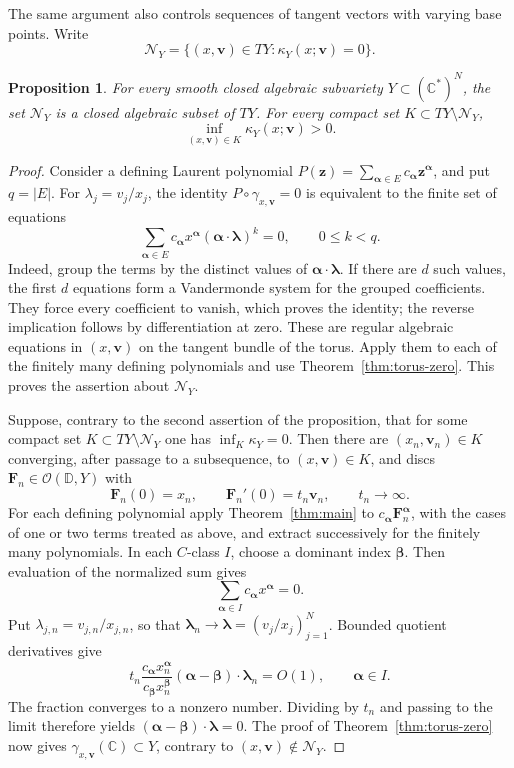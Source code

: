 \documentclass[12pt,letterpaper,reqno]{amsart}
\newtheorem{prop}[thm]{Proposition}
\theoremstyle{definition}
\numberwithin{equation}{section}
\newcommand{\D}{\mathbb D}
\newcommand{\C}{\mathbb C}
\newcommand{\OO}{\mathcal O}
\begin{document}
	The same argument also controls sequences of tangent vectors with
	varying base points. Write
	\[
	\mathcal N_Y=\{(x,\bm{v})\in TY:\kappa_Y(x;\bm{v})=0\}.
	\]
	
	\begin{prop}\label{prop:torus-null-set}
		For every smooth closed algebraic subvariety $Y\subset(\C^*)^N$,
		the set $\mathcal N_Y$ is a closed algebraic subset of $TY$. For
		every compact set $K\subset TY\setminus\mathcal N_Y$,
		\[
		\inf_{(x,\bm{v})\in K}\kappa_Y(x;\bm{v})>0.
		\]
	\end{prop}
	
	\begin{proof}
		Consider a defining Laurent polynomial
		$P(\bm{z})=\sum_{\bm{\alpha}\in E}c_{\bm{\alpha}} \bm{z}^{\bm{\alpha}}$, and put $q=|E|$.
		For $\lambda_j=v_j/x_j$, the identity
		$P\circ\gamma_{x,\bm{v}}=0$ is equivalent to the finite set of equations
		\[
		\sum_{\bm{\alpha}\in E}c_{\bm{\alpha}} x^{\bm{\alpha}}(\bm{\alpha}\cdot\bm{\lambda})^k=0,
		\qquad 0\le k<q.
		\]
		Indeed, group the terms by the distinct values of
		$\bm{\alpha}\cdot\bm{\lambda}$. If there are $d$ such values, the first $d$
		equations form a Vandermonde system for the grouped coefficients.
		They force every coefficient to vanish, which proves the identity;
		the reverse implication follows by differentiation at zero.
		These are regular algebraic equations in $(x,\bm{v})$ on the tangent
		bundle of the torus. Apply them to each of the finitely many defining
		polynomials and use Theorem~\ref{thm:torus-zero}. This proves the
		assertion about $\mathcal N_Y$.
		
		Suppose, contrary to the second assertion of the proposition, that
		for some compact set $K\subset TY\setminus\mathcal N_Y$ one has
		$\inf_K\kappa_Y=0$. Then there are $(x_n,\bm{v}_n)\in K$ converging,
		after passage to a subsequence, to $(x,\bm{v})\in K$, and discs
		$\bm F_n\in\OO(\D,Y)$ with
		\[
		\bm F_n(0)=x_n,\qquad \bm F_n'(0)=t_n\bm{v}_n,\qquad t_n\to\infty.
		\]
		For each defining polynomial apply Theorem~\ref{thm:main} to
		$c_{\bm{\alpha}}\bm F_n^{\bm{\alpha}}$, with the cases of one or two
		terms treated as above, and extract successively for the finitely many
		polynomials. In each $C$-class $I$, choose a dominant index
		$\bm{\beta}$. Then
		evaluation of the normalized sum gives
		\[
		\sum_{\bm{\alpha}\in I}c_{\bm{\alpha}} x^{\bm{\alpha}}=0.
		\]
		Put $\lambda_{j,n}=v_{j,n}/x_{j,n}$, so that
		$\bm{\lambda}_n\to\bm{\lambda}=(v_j/x_j)_{j=1}^N$. Bounded quotient
		derivatives give
		\[
		t_n\frac{c_{\bm{\alpha}} x_n^{\bm{\alpha}}}{c_{\bm{\beta}} x_n^{\bm{\beta}}}
		(\bm{\alpha}-\bm{\beta})\cdot\bm{\lambda}_n=O(1),
		\qquad \bm{\alpha}\in I.
		\]
		The fraction converges to a nonzero number. Dividing by $t_n$ and
		passing to the limit therefore yields
		$(\bm{\alpha}-\bm{\beta})\cdot\bm{\lambda}=0$. The proof of
		Theorem~\ref{thm:torus-zero} now gives
		$\gamma_{x,\bm{v}}(\C)\subset Y$, contrary to
		$(x,\bm{v})\notin\mathcal N_Y$.
	\end{proof}
	
\end{document}
